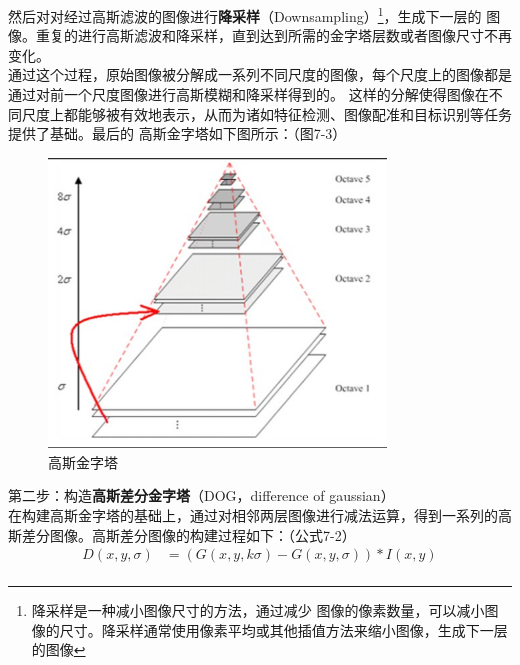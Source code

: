 \documentclass{nwputhesis}
\begin{document}
\indent
然后对对经过高斯滤波的图像进行\textbf{降采样}（Downsampling）\footnote{降采样是一种减小图像尺寸的方法，通过减少
图像的像素数量，可以减小图像的尺寸。降采样通常使用像素平均或其他插值方法来缩小图像，生成下一层的图像}，生成下一层的
图像。重复的进行高斯滤波和降采样，直到达到所需的金字塔层数或者图像尺寸不再变化。\\
\indent
通过这个过程，原始图像被分解成一系列不同尺度的图像，每个尺度上的图像都是通过对前一个尺度图像进行高斯模糊和降采样得到的。
这样的分解使得图像在不同尺度上都能够被有效地表示，从而为诸如特征检测、图像配准和目标识别等任务提供了基础。最后的
高斯金字塔如下图所示：（图7-3）
\begin{figure}[H]
    \centering
    \includegraphics[width=0.8\textwidth]{picture/23.png}
    \caption{高斯金字塔}
\end{figure}
\noindent
第二步：构造\textbf{高斯差分金字塔}（DOG，difference of gaussian）\\
\indent
在构建高斯金字塔的基础上，通过对相邻两层图像进行减法运算，得到一系列的高斯差分图像。高斯差分图像的构建过程如下：（公式7-2）
\begin{equation}
    \begin{aligned}
        D(x,y,\sigma) &= (G(x,y,k\sigma) - G(x,y,\sigma)) * I(x,y)\\
    \end{aligned}
\end{equation}
\end{document}
